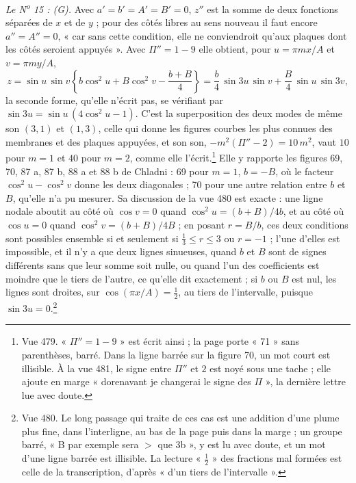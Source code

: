 \documentclass[11pt,a4paper]{article}
\begin{document}
\emph{Le N\textsuperscript{o} 15 : (G).} Avec $a' = b' = A' = B' = 0$, $z''$ est la
somme de deux fonctions séparées de $x$ et de $y$ ; pour des côtés libres au sens
nouveau il faut encore $a'' = A'' = 0$, « car sans cette condition, elle ne
conviendroit qu'aux plaques dont les côtés seroient appuyés ». Avec
$\Pi'' = 1 - 9$ elle obtient, pour $u = \pi m x/A$ et $v = \pi m y/A$,
\[
z = \sin u\,\sin v\left\{b\cos^2 u + B\cos^2 v - \frac{b+B}{4}\right\}
= \frac{b}{4}\,\sin 3u\,\sin v + \frac{B}{4}\,\sin u\,\sin 3v ,
\]
la seconde forme, qu'elle n'écrit pas, se vérifiant par $\sin 3u = \sin u\,(4\cos^2 u - 1)$.
C'est la superposition des deux modes de même son $(3,1)$ et $(1,3)$, celle qui donne
les figures courbes les plus connues des membranes et des plaques appuyées, et son son,
$-m^2(\Pi''-2) = 10\,m^2$, vaut $10$ pour $m = 1$ et $40$ pour $m = 2$, comme elle
l'écrit.\footnote{Vue 479. « $\Pi'' = 1 - 9$ » est écrit ainsi ; la page porte « 71 »
sans parenthèses, barré. Dans la ligne barrée sur la figure 70, un mot court est
illisible. À la vue 481, le signe entre $\Pi''$ et $2$ est noyé sous une tache ; elle
ajoute en marge « dorenavant je changerai le signe des $\Pi$ », la dernière lettre lue
avec doute.} Elle y rapporte les figures 69, 70, 87 a, 87 b, 88 a et 88 b de Chladni :
69 pour $m = 1$, $b = -B$, où le facteur $\cos^2 u - \cos^2 v$ donne les deux
diagonales ; 70 pour une autre relation entre $b$ et $B$, qu'elle n'a pu mesurer. Sa
discussion de la vue 480 est exacte : une ligne nodale aboutit au côté où
$\cos v = 0$ quand $\cos^2 u = (b+B)/4b$, et au côté où $\cos u = 0$ quand
$\cos^2 v = (b+B)/4B$ ; en posant $r = B/b$, ces deux conditions sont possibles
ensemble si et seulement si $\frac13 \le r \le 3$ ou $r = -1$ ; l'une d'elles est
impossible, et il n'y a que deux lignes sinueuses, quand $b$ et $B$ sont de signes
différents sans que leur somme soit nulle, ou quand l'un des coefficients est moindre
que le tiers de l'autre, ce qu'elle dit exactement ; si $b$ ou $B$ est nul, les lignes
sont droites, sur $\cos(\pi x/A) = \frac12$, au tiers de l'intervalle, puisque
$\sin 3u = 0$.\footnote{Vue 480. Le long passage qui traite de ces cas est une addition
d'une plume plus fine, dans l'interligne, au bas de la page puis dans la marge ; un
groupe barré, « B par exemple sera $>$ que 3b », y est lu avec doute, et un mot d'une
ligne barrée est illisible. La lecture « $\frac12$ » des fractions mal formées est celle
de la transcription, d'après « d'un tiers de l'intervalle ».}
\end{document}
